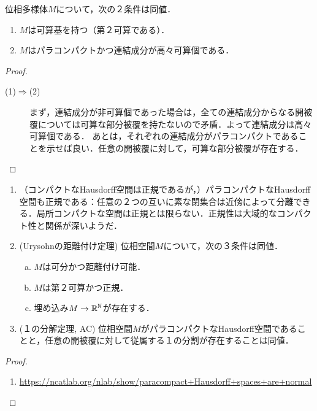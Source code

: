 \documentclass[uplatex,dvipdfmx]{jsreport}
\begin{document}
\begin{corollary}
    位相多様体$M$について，次の２条件は同値．
    \begin{enumerate}
        \item $M$は可算基を持つ（第２可算である）．
        \item $M$はパラコンパクトかつ連結成分が高々可算個である．
    \end{enumerate}
\end{corollary}
\begin{proof}\mbox{}
    \begin{description}
        \item[(1)$\Rightarrow$(2)] まず，連結成分が非可算個であった場合は，全ての連結成分からなる開被覆については可算な部分被覆を持たないので矛盾．よって連結成分は高々可算個である．
        あとは，それぞれの連結成分がパラコンパクトであることを示せば良い．任意の開被覆に対して，可算な部分被覆が存在する．
    \end{description}
\end{proof}

\begin{example}[長い直線]
    
\end{example}

\begin{theorem}\mbox{}
    \begin{enumerate}
        \item （コンパクトなHausdorff空間は正規であるが，）パラコンパクトなHausdorff空間も正規である：任意の２つの互いに素な閉集合は近傍によって分離できる．局所コンパクトな空間は正規とは限らない．正規性は大域的なコンパクト性と関係が深いようだ．
        \item (Urysohnの距離付け定理) 位相空間$M$について，次の３条件は同値．
        \begin{enumerate}[(a)]
            \item $M$は可分かつ距離付け可能．
            \item $M$は第２可算かつ正規．
            \item 埋め込み$M\to\mathbb{R}^{\mathbb{N}}$が存在する．
        \end{enumerate}
        \item (１の分解定理, AC) 位相空間$M$がパラコンパクトなHausdorff空間であることと，任意の開被覆に対して従属する１の分割が存在することは同値．
    \end{enumerate}
\end{theorem}
\begin{proof}\mbox{}
    \begin{enumerate}
        \item \url{https://ncatlab.org/nlab/show/paracompact+Hausdorff+spaces+are+normal}
    \end{enumerate}
\end{proof}
\end{document}
